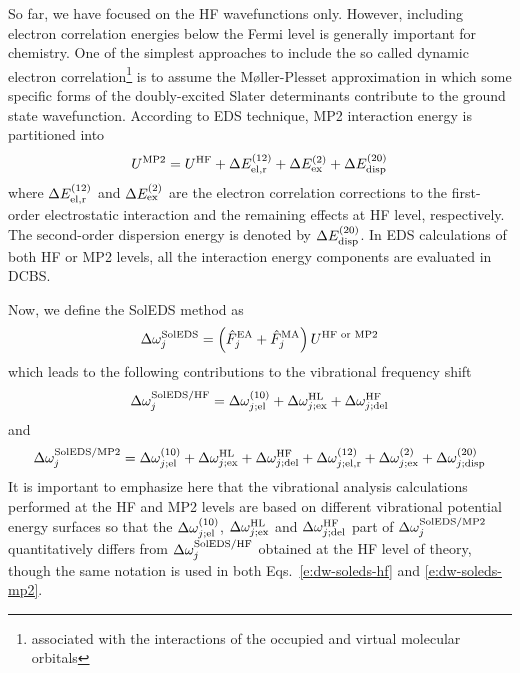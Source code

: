 \documentclass[a4paper,titlepage,twoside,fleqn,12pt]{book}
\begin{document}
\begin{refsection}
So far, we have focused on the HF wavefunctions only.\citep{Roothaan.RevModPhys.1951} 
However, including
electron correlation energies below the Fermi level is generally important
for chemistry. One of the simplest approaches to include the 
so called dynamic electron correlation\footnote{associated with
the interactions of the occupied and virtual molecular orbitals}
is to assume the 
M{\o}ller\hyp{}Plesset approximation\citep{Moller.Plesset.PhysRev.1934}
in which some specific forms of the doubly\hyp{}excited Slater
determinants contribute to the ground state wavefunction.
According to EDS technique, MP2 interaction energy is
partitioned into
%
\begin{equation}
 U^{\rm MP2} = U^{\rm HF}                    + 
               \Delta E_{\rm el,r}^{(12)}    + 
               \Delta E_{\rm ex}^{(2)}       +
               \Delta E_{\rm disp}^{(20)}  
\end{equation}
%
where $\Delta E_{\rm el,r}^{(12)}$ and $\Delta E_{\rm ex}^{(2)}$
are the electron correlation corrections to the first\hyp{}order
electrostatic interaction and the remaining effects at HF level,
respectively. The second\hyp{}order dispersion energy
is denoted by $\Delta E_{\rm disp}^{(20)}$. In EDS calculations
of both HF or MP2 levels,
all the interaction energy components are evaluated in DCBS.

Now, we define the SolEDS method as
%
\begin{equation}
 \Delta\omega_j^{\rm SolEDS} = \left(\hat{F}_j^{\rm EA} + \hat{F}_j^{\rm MA}\right)  U^{\rm HF\text{ or }MP2} 
\end{equation}
%
which leads to the following contributions to the vibrational
frequency shift
%
\begin{equation} \label{e:dw-soleds-hf}
 \Delta\omega_j^{\rm SolEDS/HF} = 
              \Delta \omega_{j;{\rm el}}^{(10)}    + 
              \Delta \omega_{j;{\rm ex}}^{\rm HL}  +
              \Delta \omega_{j;{\rm del}}^{\rm HF}
\end{equation}
%
and
%
\begin{equation} \label{e:dw-soleds-mp2}
 \Delta\omega_j^{\rm SolEDS/MP2} = 
              \Delta \omega_{j;{\rm el}}^{(10)}    + 
              \Delta \omega_{j;{\rm ex}}^{\rm HL}  +
              \Delta \omega_{j;{\rm del}}^{\rm HF} +
               \Delta \omega_{j;{\rm el,r}}^{(12)}    + 
               \Delta \omega_{j;{\rm ex}}^{(2)}       +
               \Delta \omega_{j;{\rm disp}}^{(20)}  
\end{equation}
%
It is important to emphasize here that the vibrational analysis 
calculations performed at the HF and MP2 levels are based on different
vibrational potential energy surfaces so that the $\Delta \omega_{j;{\rm el}}^{(10)}$,
$\Delta \omega_{j;{\rm ex}}^{\rm HL}$ and $\Delta \omega_{j;{\rm del}}^{\rm HF}$ 
part of $\Delta\omega_j^{\rm SolEDS/MP2}$ quantitatively differs from
$\Delta\omega_j^{\rm SolEDS/HF}$ obtained at the HF level of theory,
though the same notation is used in both Eqs.~\eqref{e:dw-soleds-hf} 
and \eqref{e:dw-soleds-mp2}.


\end{refsection}
\end{document}
